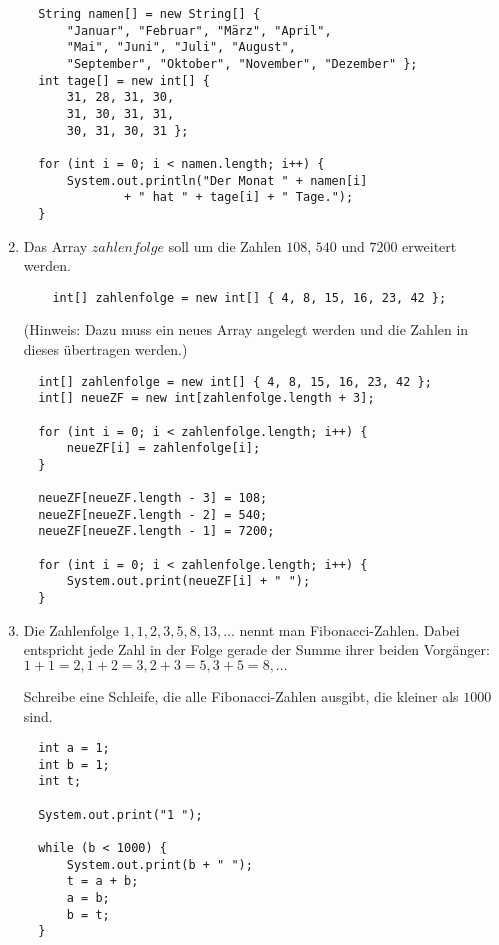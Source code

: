 \documentclass[final,a4paper]{article}
\begin{document}
\begin{enumerate}
{	\begin{lstlisting}
  String namen[] = new String[] {
	  "Januar", "Februar", "März", "April",
	  "Mai", "Juni", "Juli", "August",
	  "September", "Oktober", "November", "Dezember" };
  int tage[] = new int[] {
	  31, 28, 31, 30,
	  31, 30, 31, 31,
	  30, 31, 30, 31 };

  for (int i = 0; i < namen.length; i++) {
	  System.out.println("Der Monat " + namen[i]
			  + " hat " + tage[i] + " Tage.");
  }
	\end{lstlisting}
	}
  \item{
	Das Array $zahlenfolge$ soll um die Zahlen $108$, $540$ und $7200$ erweitert werden.
	\begin{lstlisting}
	int[] zahlenfolge = new int[] { 4, 8, 15, 16, 23, 42 };
	\end{lstlisting}
	(Hinweis: Dazu muss ein neues Array angelegt werden und die Zahlen in dieses übertragen werden.)

	\begin{lstlisting}
  int[] zahlenfolge = new int[] { 4, 8, 15, 16, 23, 42 };
  int[] neueZF = new int[zahlenfolge.length + 3];

  for (int i = 0; i < zahlenfolge.length; i++) {
	  neueZF[i] = zahlenfolge[i];
  }

  neueZF[neueZF.length - 3] = 108;
  neueZF[neueZF.length - 2] = 540;
  neueZF[neueZF.length - 1] = 7200;

  for (int i = 0; i < zahlenfolge.length; i++) {
	  System.out.print(neueZF[i] + " ");
  }
	\end{lstlisting}
	}
  \item{
	Die Zahlenfolge $1, 1, 2, 3, 5, 8, 13, \ldots$ nennt man Fibonacci-Zahlen. Dabei entspricht jede Zahl
	in der Folge gerade der Summe ihrer beiden Vorgänger: $1+1=2, 1+2=3, 2+3=5, 3+5=8, \ldots$

	Schreibe eine Schleife, die alle Fibonacci-Zahlen ausgibt, die kleiner als $1000$ sind.

	\begin{lstlisting}
  int a = 1;
  int b = 1;
  int t;

  System.out.print("1 ");

  while (b < 1000) {
	  System.out.print(b + " ");
	  t = a + b;
	  a = b;
	  b = t;
  }
	\end{lstlisting}
	}
\end{enumerate}
\end{document}
